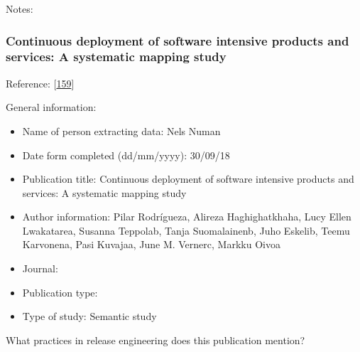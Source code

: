 \documentclass[]{book}
\providecommand{\tightlist}{%
  \setlength{\itemsep}{0pt}\setlength{\parskip}{0pt}}
\begin{document}
Notes:

\subsubsection{Continuous deployment of software intensive products and
services: A systematic mapping
study}\label{continuous-deployment-of-software-intensive-products-and-services-a-systematic-mapping-study}

Reference: {[}\protect\hyperlink{ref-rodriguez2017a}{159}{]}

General information:

\begin{itemize}
\tightlist
\item
  Name of person extracting data: Nels Numan
\item
  Date form completed (dd/mm/yyyy): 30/09/18
\item
  Publication title: Continuous deployment of software intensive
  products and services: A systematic mapping study
\item
  Author information: Pilar Rodrígueza, Alireza Haghighatkhaha, Lucy
  Ellen Lwakatarea, Susanna Teppolab, Tanja Suomalainenb, Juho Eskelib,
  Teemu Karvonena, Pasi Kuvajaa, June M. Vernerc, Markku Oivoa
\item
  Journal:
\item
  Publication type:
\item
  Type of study: Semantic study
\end{itemize}

What practices in release engineering does this publication mention?
\end{document}

